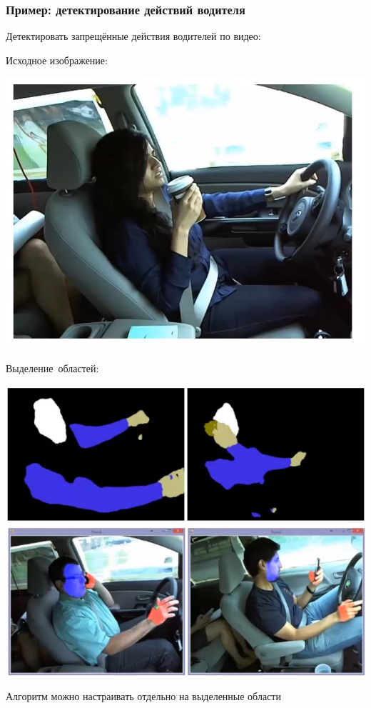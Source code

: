 \documentclass[fleqn, xcolor=x11names]{beamer}
\begin{document}
\begin{frame}[fragile]\frametitle{Пример: детектирование действий водителя}
Детектировать запрещённые действия водителей по видео:

\hfill

\begin{minipage}{0.49\linewidth}
Исходное изображение:

{\includegraphics[scale=0.3]{images/girl_car.png}}
\end{minipage}
\begin{minipage}{0.49\linewidth}
Выделение~областей:

{\includegraphics[scale=0.3]{images/faces_car.png}}
\end{minipage}

\hfill

Алгоритм можно настраивать отдельно на выделенные области

\end{frame}
\end{document}
